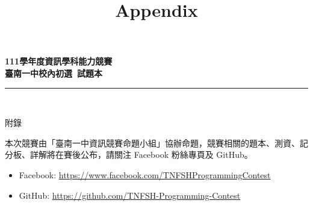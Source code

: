 \documentclass[a4paper]{article}
\title{Appendix}
\begin{document}
\begin{center}
\textbf{\huge 111學年度資訊學科能力競賽}\\
\vspace{5mm}
\textbf{\huge 臺南一中校內初選\ 試題本}\\
\vspace{10mm}
\rule{17cm}{2pt}\\
\vspace{5mm}

\huge 附錄\\
\end{center}

\fontsize{14pt}{20pt}\selectfont

\noindent 本次競賽由「臺南一中資訊競賽命題小組」協辦命題，競賽相關的題本、測資、記分板、詳解將在賽後公布，請關注 Facebook 粉絲專頁及 GitHub。
\begin{itemize}
	\item Facebook: \url{https://www.facebook.com/TNFSHProgrammingContest}
	\item GitHub: \url{https://github.com/TNFSH-Programming-Contest}
\end{itemize}
\end{document}
